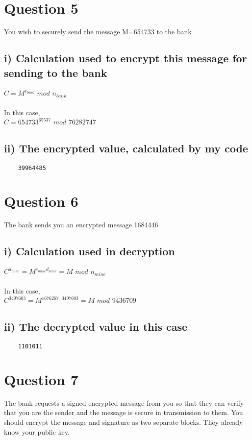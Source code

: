 \documentclass[a4paper,12pt]{article}
\begin{document}
\section*{Question 5}
You wish to securely send the message M=654733 to the bank
\subsection*{i) Calculation used to encrypt this message for sending to the bank}
$C = M^{e_{bank}}$ $mod$ $n_{bank}$\\\\
In this case,\\
$C = 654733^{65537}$ $mod$ $76282747$
\subsection*{ii) The encrypted value, calculated by my code}
\begin{verbatim}
    39964485
\end{verbatim}

\section*{Question 6}
The bank sends you an encrypted message 1684446
\subsection*{i) Calculation used in decryption}
$C^{d_{mine}} = M^{e_{mine}d_{mine}} = M$ $mod$ $n_{mine}$\\\\
In this case,\\
$C^{3497603} = M^{1676267\cdot3497603} = M$ $mod$ $9436709$
\subsection*{ii) The decrypted value in this case}
\begin{verbatim}
    1101011
\end{verbatim}

\section*{Question 7}
The bank requests a signed encrypted message from you so that they can verify that you are the sender and the message is secure in transmission to them. You should encrypt the message and signature as two separate blocks. They already know your public key.
\end{document}

